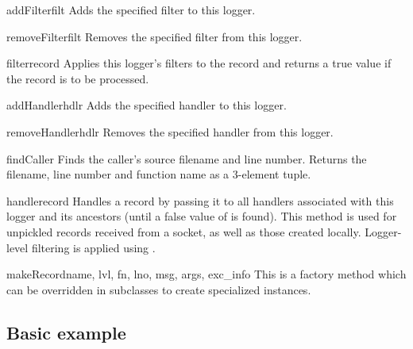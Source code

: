 \begin{methoddesc}{addFilter}{filt}
Adds the specified filter  to this logger.
\end{methoddesc}

\begin{methoddesc}{removeFilter}{filt}
Removes the specified filter  from this logger.
\end{methoddesc}

\begin{methoddesc}{filter}{record}
Applies this logger's filters to the record and returns a true value if
the record is to be processed.
\end{methoddesc}

\begin{methoddesc}{addHandler}{hdlr}
Adds the specified handler  to this logger.
\end{methoddesc}

\begin{methoddesc}{removeHandler}{hdlr}
Removes the specified handler  from this logger.
\end{methoddesc}

\begin{methoddesc}[Logger]{findCaller}{}
Finds the caller's source filename and line number. Returns the filename,
line number and function name as a 3-element tuple.
\end{methoddesc}

\begin{methoddesc}{handle}{record}
Handles a record by passing it to all handlers associated with this logger
and its ancestors (until a false value of  is found).
This method is used for unpickled records received from a socket, as well
as those created locally. Logger-level filtering is applied using
.
\end{methoddesc}

\begin{methoddesc}{makeRecord}{name, lvl, fn, lno, msg, args, exc_info}
This is a factory method which can be overridden in subclasses to create
specialized  instances.
\end{methoddesc}

\subsection{Basic example \label{minimal-example}}


